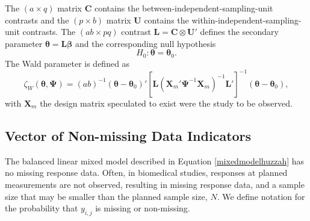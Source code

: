 \documentclass[11pt]{article}
\begin{document}
The $\left(a\times q\right)$ matrix $\boldsymbol{C}$ contains the between-independent-sampling-unit contrasts and the $\left(p\times b\right)$ matrix $\boldsymbol{U}$ contains the within-independent-sampling-unit contrasts. The $\left(ab\times pq\right)$ contrast $\boldsymbol{L}=\boldsymbol{C}\otimes\boldsymbol{U}'$ defines the secondary parameter $\boldsymbol{\theta}=\boldsymbol{L\beta}$ and the corresponding null hypothesis
\begin{equation}
H_0:\boldsymbol{\theta}=\boldsymbol{\theta}_{0}.
\end{equation}
The Wald parameter is defined as 
\begin{equation}
\label{zetabam}
\zeta_{W}\left(\boldsymbol{\theta},\boldsymbol{\Psi}\right)=\left(ab\right)^{-1}\left(\boldsymbol{\theta}-\boldsymbol{\theta}_{0}\right)'\left[\boldsymbol{L}\left(\boldsymbol{X}_{m}'\boldsymbol{\Psi}^{-1}\boldsymbol{X}_{m}\right)^{-1}\boldsymbol{L}'\right]^{-1}\left(\boldsymbol{\theta}-\boldsymbol{\theta}_{0}\right),
\end{equation}
with $\boldsymbol{X}_{m}$ the design matrix speculated to exist were the study to be observed.

\subsection{Vector of Non-missing Data Indicators}

The balanced linear mixed model described in Equation \ref{mixedmodelhuzzah} has no missing response data. Often, in biomedical studies, responses at planned measurements are not observed, resulting in missing response data, and a sample size that may be smaller than the planned sample size, $N$. We define notation for the probability that $y_{i,j}$ is missing or non-missing.
\end{document}

